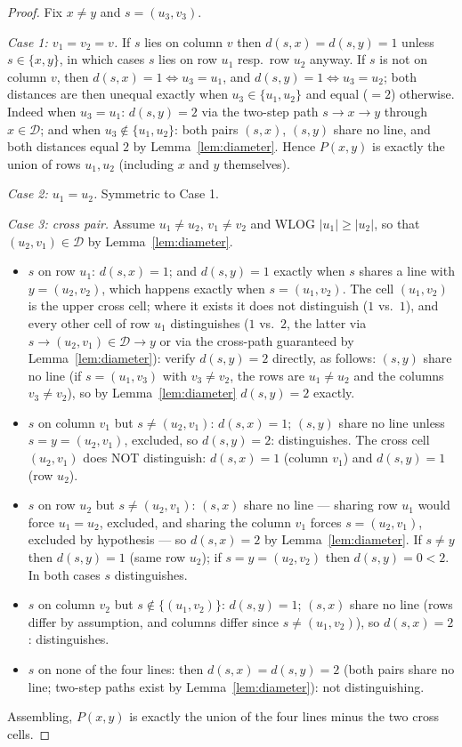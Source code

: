 \documentclass[12pt]{article}
\theoremstyle{definition}
\newcommand{\DD}{\mathcal{D}}
\begin{document}
\begin{proof}
Fix $x\ne y$ and $s=(u_3,v_3)$.

\emph{Case 1: $v_1=v_2=v$.} If $s$ lies on column $v$ then $d(s,x)=d(s,y)=1$ unless $s\in\{x,y\}$, in which cases $s$ lies on row $u_1$ resp.\ row $u_2$ anyway. If $s$ is not on column $v$, then $d(s,x)=1\iff u_3=u_1$, and $d(s,y)=1\iff u_3=u_2$; both distances are then unequal exactly when $u_3\in\{u_1,u_2\}$ and equal ($=2$) otherwise. Indeed when $u_3=u_1$: $d(s,y)=2$ via the two-step path $s\to x\to y$ through $x\in\DD$; and when $u_3\notin\{u_1,u_2\}$: both pairs $(s,x)$, $(s,y)$ share no line, and both distances equal $2$ by Lemma~\ref{lem:diameter}. Hence $P(x,y)$ is exactly the union of rows $u_1,u_2$ (including $x$ and $y$ themselves).

\emph{Case 2: $u_1=u_2$.} Symmetric to Case 1.

\emph{Case 3: cross pair.} Assume $u_1\neq u_2$, $v_1\neq v_2$ and WLOG $|u_1|\ge|u_2|$, so that $(u_2,v_1)\in\DD$ by Lemma~\ref{lem:diameter}.
\begin{itemize}[leftmargin=6mm,itemsep=2pt]
\item $s$ on row $u_1$: $d(s,x)=1$; and $d(s,y)=1$ exactly when $s$ shares a line with $y=(u_2,v_2)$, which happens exactly when $s=(u_1,v_2)$. The cell $(u_1,v_2)$ is the upper cross cell; where it exists it does not distinguish ($1$ vs.\ $1$), and every other cell of row $u_1$ distinguishes ($1$ vs.\ $2$, the latter via $s\to(u_2,v_1)\in\DD\to y$ or via the cross-path guaranteed by Lemma~\ref{lem:diameter}): verify $d(s,y)=2$ directly, as follows: $(s,y)$ share no line (if $s=(u_1,v_3)$ with $v_3\ne v_2$, the rows are $u_1\ne u_2$ and the columns $v_3\ne v_2$), so by Lemma~\ref{lem:diameter} $d(s,y)=2$ exactly.
\item $s$ on column $v_1$ but $s\ne (u_2,v_1)$: $d(s,x)=1$; $(s,y)$ share no line unless $s=y=(u_2,v_1)$, excluded, so $d(s,y)=2$: distinguishes. The cross cell $(u_2,v_1)$ does NOT distinguish: $d(s,x)=1$ (column $v_1$) and $d(s,y)=1$ (row $u_2$).
\item $s$ on row $u_2$ but $s\ne (u_2,v_1)$: $(s,x)$ share no line --- sharing row $u_1$ would force $u_1=u_2$, excluded, and sharing the column $v_1$ forces $s=(u_2,v_1)$, excluded by hypothesis --- so $d(s,x)=2$ by Lemma~\ref{lem:diameter}. If $s\neq y$ then $d(s,y)=1$ (same row $u_2$); if $s=y=(u_2,v_2)$ then $d(s,y)=0<2$. In both cases $s$ distinguishes.
\item $s$ on column $v_2$ but $s\notin\{(u_1,v_2)\}$: $d(s,y)=1$; $(s,x)$ share no line (rows differ by assumption, and columns differ since $s\neq(u_1,v_2)$), so $d(s,x)=2$: distinguishes.
\item $s$ on none of the four lines: then $d(s,x)=d(s,y)=2$ (both pairs share no line; two-step paths exist by Lemma~\ref{lem:diameter}): not distinguishing.
\end{itemize}
Assembling, $P(x,y)$ is exactly the union of the four lines minus the two cross cells.
\end{proof}
\end{document}
